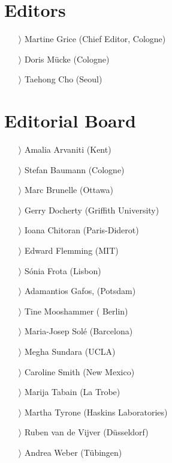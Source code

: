 \documentclass[
notumble,
nofoldmark,
]{leaflet}
\begin{document}
 
{
    \color{LIGHTGRAY}
\small
    \section{Editors}    

    \begin{itemize}
    \item[$\rangle$] Martine Grice (Chief Editor, Cologne)
    \item[$\rangle$] Doris M\"ucke (Cologne)
    \item[$\rangle$] Taehong Cho (Seoul)
    \end{itemize}

    \section{Editorial Board}    

    \begin{itemize}
    \item[$\rangle$] Amalia Arvaniti (Kent)
    \item[$\rangle$] Stefan Baumann (Cologne)
    \item[$\rangle$] Marc Brunelle (Ottawa)
    \item[$\rangle$] Gerry Docherty (Griffith University)
    \item[$\rangle$] Ioana Chitoran (Paris-Diderot)
    \item[$\rangle$] Edward Flemming (MIT)
    \item[$\rangle$] S\'onia Frota (Lisbon)
    \item[$\rangle$] Adamantios Gafos, (Potsdam)
    \item[$\rangle$] Tine Mooshammer ( Berlin)
    \item[$\rangle$] Maria-Josep Sol\'e (Barcelona)
    \item[$\rangle$] Megha Sundara (UCLA)
    \item[$\rangle$] Caroline Smith (New Mexico)
    \item[$\rangle$] Marija Tabain (La Trobe)
    \item[$\rangle$] Martha Tyrone (Haskins Laboratories)
    \item[$\rangle$] Ruben van de Vijver (D\"usseldorf)
    \item[$\rangle$] Andrea Weber (T\"ubingen) 
    \end{itemize}
}
 
\end{document}
